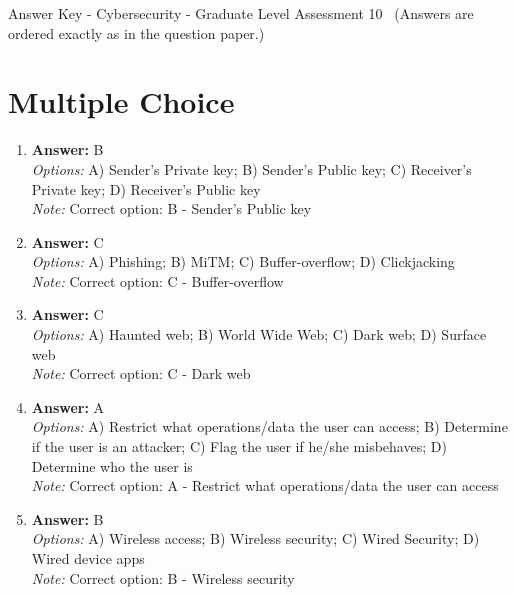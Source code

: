\documentclass[12pt]{article}
\begin{document}
\begin{center}
Answer Key - Cybersecurity - Graduate Level Assessment 10 \
\small (Answers are ordered exactly as in the question paper.)
\end{center}

\section*{Multiple Choice}
\begin{enumerate}[label=\arabic*.]
\item \textbf{Answer:} B
\\ \textit{Options:} A) Sender's Private key; B) Sender's Public key; C) Receiver's Private key; D) Receiver's Public key
\\ \textit{Note:} Correct option: B - Sender's Public key
\item \textbf{Answer:} C
\\ \textit{Options:} A) Phishing; B) MiTM; C) Buffer-overflow; D) Clickjacking
\\ \textit{Note:} Correct option: C - Buffer-overflow
\item \textbf{Answer:} C
\\ \textit{Options:} A) Haunted web; B) World Wide Web; C) Dark web; D) Surface web
\\ \textit{Note:} Correct option: C - Dark web
\item \textbf{Answer:} A
\\ \textit{Options:} A) Restrict what operations/data the user can access; B) Determine if the user is an attacker; C) Flag the user if he/she misbehaves; D) Determine who the user is
\\ \textit{Note:} Correct option: A - Restrict what operations/data the user can access
\item \textbf{Answer:} B
\\ \textit{Options:} A) Wireless access; B) Wireless security; C) Wired Security; D) Wired device apps
\\ \textit{Note:} Correct option: B - Wireless security
\end{enumerate}
\end{document}
